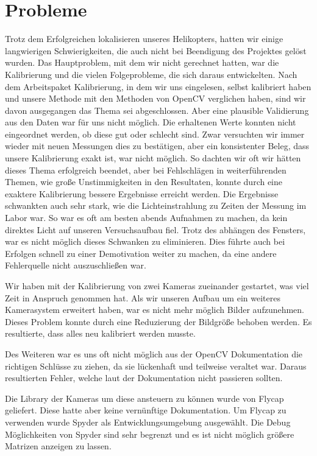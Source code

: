 \chapter{Probleme}
\label{cha:probleme}

Trotz dem Erfolgreichen lokalisieren unseres Helikopters, hatten wir einige langwierigen Schwierigkeiten, die auch nicht bei Beendigung des Projektes gelöst wurden. Das Hauptproblem, mit dem wir nicht gerechnet hatten, war die Kalibrierung und die vielen Folgeprobleme, die sich daraus entwickelten. Nach dem Arbeitspaket Kalibrierung, in dem wir uns eingelesen, selbst kalibriert haben und unsere Methode mit den Methoden von OpenCV verglichen haben, sind wir davon ausgegangen das Thema sei abgeschlossen. Aber eine plausible Validierung aus den Daten war für uns nicht möglich. Die erhaltenen Werte konnten nicht eingeordnet werden, ob diese gut oder schlecht sind. Zwar versuchten wir immer wieder mit neuen Messungen dies zu bestätigen, aber ein konsistenter Beleg, dass unsere Kalibrierung exakt ist, war nicht möglich. So dachten wir oft wir hätten dieses Thema erfolgreich beendet, aber bei Fehlschlägen in weiterführenden Themen, wie große Unstimmigkeiten in den Resultaten, konnte durch eine exaktere Kalibrierung bessere Ergebnisse erreicht werden. Die Ergebnisse schwankten auch sehr stark, wie die Lichteinstrahlung zu Zeiten der Messung im Labor war. So war es oft am besten abends Aufnahmen zu machen, da kein direktes Licht auf unseren Versuchsaufbau fiel. Trotz des abhängen des Fensters, war es nicht möglich dieses Schwanken zu eliminieren. Dies führte auch bei Erfolgen schnell zu einer Demotivation weiter zu machen, da eine andere Fehlerquelle nicht auszuschließen war.\newline

\noindent Wir haben mit der Kalibrierung von zwei Kameras zueinander gestartet, was viel Zeit in Anspruch genommen hat. Als wir unseren Aufbau um ein weiteres Kamerasystem erweitert haben, war es nicht mehr möglich Bilder aufzunehmen. Dieses Problem konnte durch eine Reduzierung der Bildgröße behoben werden. Es resultierte, dass alles neu kalibriert werden musste.\newline

\noindent Des Weiteren war es uns oft nicht möglich aus der OpenCV Dokumentation die richtigen Schlüsse zu ziehen, da sie lückenhaft und teilweise veraltet war. Daraus resultierten Fehler, welche laut der Dokumentation nicht passieren sollten.\newline

\noindent Die Library der Kameras um diese ansteuern zu können wurde von Flycap geliefert. Diese hatte aber keine vernünftige Dokumentation. Um Flycap zu verwenden wurde Spyder als Entwicklungsumgebung ausgewählt. Die Debug Möglichkeiten von Spyder sind sehr begrenzt und es ist nicht möglich größere Matrizen anzeigen zu lassen.
